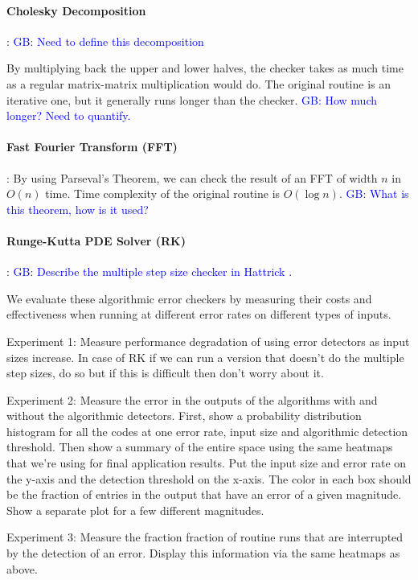 \documentclass[prodmode,acmtecs]{acmconf} %
\newcommand{\greg}[1]{%
  \textcolor{blue}{GB: #1}
}
\begin{document}
\paragraph{Cholesky Decomposition}: \greg{Need to define this decomposition}
By multiplying back the upper and lower halves, the checker takes as much time as a regular matrix-matrix multiplication would do. The original routine is an iterative one, but it generally runs longer than the checker. \greg{How much longer? Need to quantify.}

\paragraph{Fast Fourier Transform (FFT)}:
By using Parseval's Theorem, we can check the result of an FFT of width $n$ in $O(n)$ time. Time complexity of the original routine is $O(\log{n})$.
\greg{What is this theorem, how is it used?}

\paragraph{Runge-Kutta PDE Solver (RK)}:
\greg{Describe the multiple step size checker in Hattrick}.

We evaluate these algorithmic error checkers by measuring their costs and effectiveness when running at different error rates on different types of inputs.

Experiment 1: Measure performance degradation of using error detectors as input sizes increase. In case of RK if we can run a version that doesn't do the multiple step sizes, do so but if this is difficult then don't worry about it.

Experiment 2: Measure the error in the outputs of the algorithms with and without the algorithmic detectors. 
First, show a probability distribution histogram for all the codes at one error rate, input size and algorithmic detection threshold.
Then show a summary of the entire space using the same heatmaps that we're using for final application results.
Put the input size and error rate on the y-axis and the detection threshold on the x-axis.
The color in each box should be the fraction of entries in the output that have an error of a given magnitude.
Show a separate plot for a few different magnitudes.

Experiment 3: Measure the fraction fraction of routine runs that are interrupted by the detection of an error.
Display this information via the same heatmaps as above.
\end{document}
